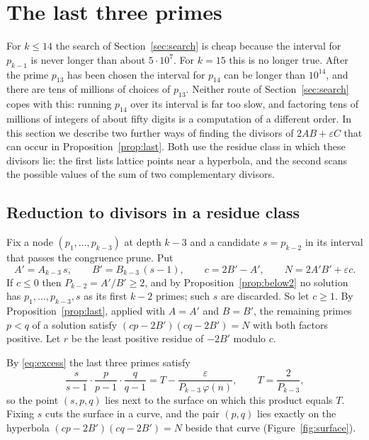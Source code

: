 \documentclass[screen,reqno]{aomart}
\numberwithin{equation}{section}
\theoremstyle{plain}
\theoremstyle{definition}
\theoremstyle{remark}
\begin{document}
\section{The last three primes}\label{sec:three}

For $k\le14$ the search of Section~\ref{sec:search} is cheap because
the interval for $p_{k-1}$ is never longer than about $5\cdot10^7$. For
$k=15$ this is no longer true. After the prime $p_{13}$ has been chosen
the interval for $p_{14}$ can be longer than $10^{14}$, and there are
tens of millions of choices of $p_{13}$. Neither route of
Section~\ref{sec:search} copes with this: running $p_{14}$ over its
interval is far too slow, and factoring tens of millions of integers of
about fifty digits is a computation of a different order. In this
section we describe two further ways of finding the divisors of
$2AB+\varepsilon C$ that can occur in Proposition~\ref{prop:last}.
Both use the residue class in which these divisors lie: the first
lists lattice points near a hyperbola, and the second scans the
possible values of the sum of two complementary divisors.

\subsection{Reduction to divisors in a residue class}
Fix a node $(p_1,\dots,p_{k-3})$ at depth $k-3$ and a candidate
$s=p_{k-2}$ in its interval that passes the congruence prune. Put
\[
  A'=A_{k-3}\,s,\qquad B'=B_{k-3}\,(s-1),\qquad c=2B'-A',\qquad
  N=2A'B'+\varepsilon c .
\]
If $c\le0$ then $P_{k-2}=A'/B'\ge2$, and by
Proposition~\ref{prop:below2} no solution has $p_1,\dots,p_{k-3},s$ as
its first $k-2$ primes; such $s$ are discarded. So let $c\ge1$. By
Proposition~\ref{prop:last}, applied with $A=A'$ and $B=B'$, the
remaining primes $p<q$ of a solution satisfy
$(cp-2B')(cq-2B')=N$ with both factors positive. Let $r$ be the least
positive residue of $-2B'$ modulo $c$.

By \eqref{eq:excess} the last three primes satisfy
\[
  \frac{s}{s-1}\cdot\frac{p}{p-1}\cdot\frac{q}{q-1}
  =T-\frac{\varepsilon}{P_{k-3}\,\varphi(n)},\qquad T=\frac{2}{P_{k-3}},
\]
so the point $(s,p,q)$ lies next to the surface on which this product
equals $T$. Fixing $s$ cuts the surface in a curve, and the pair
$(p,q)$ lies exactly on the hyperbola $(cp-2B')(cq-2B')=N$ beside that
curve (Figure~\ref{fig:surface}).
\end{document}
